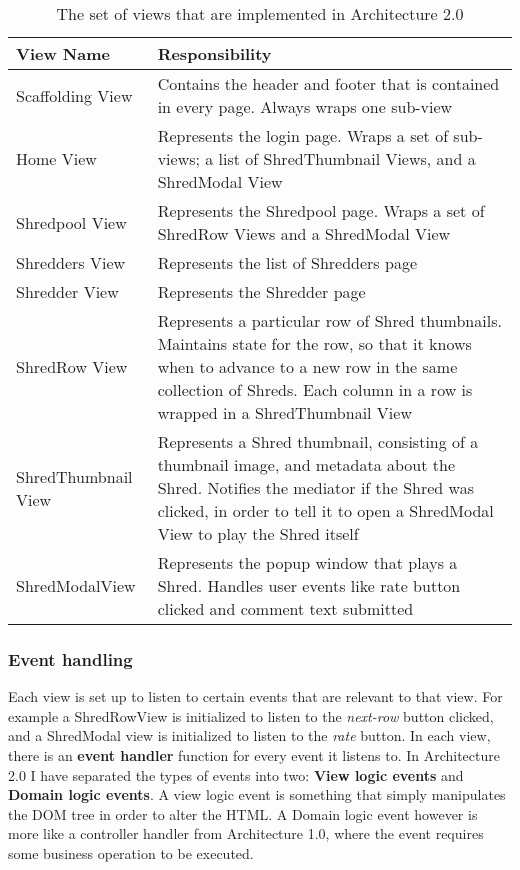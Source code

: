 \begin{table}[htbp]
  \centering
  \begin{tabular}{|p{4cm} | p{8cm}|}
    \toprule
    View Name & Responsibility \\ 
    \midrule
    Scaffolding View & Contains the header and footer that is contained in every page. Always wraps one sub-view \\ 
    Home View & Represents the login page. Wraps a set of sub-views; a list of ShredThumbnail Views, and a ShredModal View \\ 
    Shredpool View & Represents the Shredpool page. Wraps a set of ShredRow Views and a ShredModal View \\ 
    Shredders View & Represents the list of Shredders page \\
    Shredder View &  Represents the Shredder page\\ 
    ShredRow View & Represents a particular row of Shred thumbnails. Maintains state for the row, so that it knows when to advance to a new row in the same collection of Shreds.  Each column in a row is wrapped in a ShredThumbnail View\\ 
    ShredThumbnail View & Represents a Shred thumbnail, consisting of a thumbnail image, and metadata about the Shred. Notifies the mediator if the Shred was clicked, in order to tell it to open a ShredModal View to play the Shred itself \\ 
    ShredModalView & Represents the popup window that plays a Shred. Handles user events like rate button clicked and comment text submitted  \\ 
    \bottomrule
  \end{tabular}
  \caption{The set of views that are implemented in Architecture 2.0}
  \label{table:theSetOfViews}
\end{table}

\subsubsection{Event handling}
Each view is set up to listen to certain events that are relevant to that view. For example a ShredRowView is initialized to listen to the \textit{next-row} button clicked, and a ShredModal view is initialized to listen to the \textit{rate} button. In each view, there is an \textbf{event handler} function for every event it listens to. In Architecture 2.0 I have separated the types of events into two: \textbf{View logic events} and \textbf{Domain logic events}. A view logic event is something that simply manipulates the DOM tree in order to alter the HTML. A Domain logic event however is more like a controller handler from Architecture 1.0, where the event requires some business operation to be executed.

